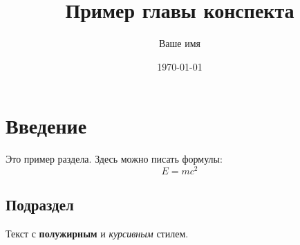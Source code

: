 \documentclass{article}
\title{Пример главы конспекта}
\author{Ваше имя}
\date{\today}
\begin{document}
\maketitle

\section{Введение}
Это пример раздела. Здесь можно писать формулы:
\[ E = mc^2 \]

\subsection{Подраздел}
Текст с \textbf{полужирным} и \emph{курсивным} стилем.
\end{document}
